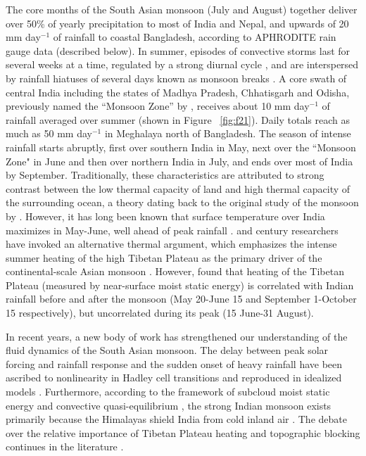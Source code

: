 	The core months of the South Asian monsoon (July and August) together deliver over 50\% of yearly precipitation to most of India and Nepal, and upwards of 20 mm day$^{-1}$ of rainfall to coastal Bangladesh, according to APHRODITE rain gauge data (described below). In summer, episodes of convective storms last for several weeks at a time, regulated by a strong diurnal cycle \citep{Romatschke2011a}, and are interspersed by rainfall hiatuses of several days known as monsoon breaks \citep{Krishnan2000}. A core swath of central India including the states of Madhya Pradesh, Chhatisgarh and Odisha, previously named the ``Monsoon Zone'' by \textcite{Gadgil2003}, receives about 10 mm day$^{-1}$ of rainfall averaged over summer (shown in Figure ~\ref{fig:f21}). Daily totals reach as much as 50 mm day$^{-1}$ in Meghalaya north of Bangladesh. The season of intense rainfall starts abruptly, first over southern India in May, next over the ``Monsoon Zone" in June and then over northern India in July, and ends over most of India by September. Traditionally, these characteristics are attributed to strong contrast between the low thermal capacity of land and high thermal capacity of the surrounding ocean, a theory dating back to the original study of the monsoon by \cite{Halley1686}. However, it has long been known that surface temperature over India maximizes in May-June, well ahead of peak rainfall \citep{Gadgil2003}.  and  century researchers have invoked an alternative thermal argument, which emphasizes the intense summer heating of the high Tibetan Plateau as the primary driver of the continental-scale Asian monsoon \citep{Yeh1959,Li1996,Wu2007}. However, \cite{Rajagopalan2013} found that heating of the Tibetan Plateau (measured by near-surface moist static energy) is correlated with Indian rainfall before and after the monsoon  (May 20-June 15 and September 1-October 15 respectively), but uncorrelated during its peak (15 June-31 August).
	
	In recent years, a new body of work has strengthened our understanding of the fluid dynamics of the South Asian monsoon. The delay between peak solar forcing and rainfall response and the sudden onset of heavy rainfall have been ascribed to nonlinearity in Hadley cell transitions and reproduced in idealized models \citep{Plumb1992,Schneider2008,Bordoni2008}. Furthermore, according to the framework of subcloud moist static energy and convective quasi-equilibrium \citep{Emanuel1995,Prive2007,Prive2007a}, the strong Indian monsoon exists primarily because the Himalayas shield India from cold inland air \citep{Boos2010}. The debate over the relative importance of Tibetan Plateau heating and topographic blocking continues in the literature \citep{Wu2012,Boos2013,Qiu2013}.
	
